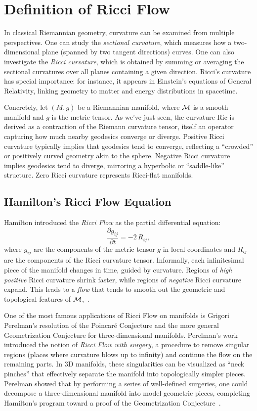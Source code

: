 \section{Definition of Ricci Flow}
In classical Riemannian geometry, curvature can be examined from multiple perspectives. One can study the \emph{sectional curvature}, which measures how a two-dimensional plane (spanned by two tangent directions) curves. One can also investigate the \emph{Ricci curvature}, which is obtained by summing or averaging the sectional curvatures over all planes containing a given direction. Ricci's curvature has special importance: for instance, it appears in Einstein's equations of General Relativity, linking geometry to matter and energy distributions in spacetime. 

Concretely, let $(M,g)$ be a Riemannian manifold, where $\mathcal{M}$ is a smooth manifold and $g$ is the metric tensor. As we've just seen, the curvature $\mathrm{Ric}$ is derived as a contraction of the Riemann curvature tensor, itself an operator capturing how much nearby geodesics converge or diverge. Positive Ricci curvature typically implies that geodesics tend to converge, reflecting a ``crowded'' or positively curved geometry akin to the sphere. Negative Ricci curvature implies geodesics tend to diverge, mirroring a hyperbolic or “saddle-like” structure. Zero Ricci curvature represents Ricci-flat manifolds.

\subsection{Hamilton's Ricci Flow Equation}
Hamilton introduced the \emph{Ricci Flow} as the partial differential equation:
\begin{equation}
\frac{\partial g_{ij}}{\partial t} = -2 \, R_{ij},
\end{equation}
where $g_{ij}$ are the components of the metric tensor $g$ in local coordinates and $R_{ij}$ are the components of the Ricci curvature tensor. Informally, each infinitesimal piece of the manifold changes in time, guided by curvature. Regions of \emph{high positive} Ricci curvature shrink faster, while regions of \emph{negative} Ricci curvature expand. This leads to a \emph{flow} that tends to smooth out the geometric and topological features of $\mathcal{M}$,~\cite{theRicciFlowAnIntroduction}.

One of the most famous applications of Ricci Flow on manifolds is Grigori Perelman's resolution of the Poincar\'{e} Conjecture and the more general Geometrization Conjecture for three-dimensional manifolds. Perelman's work introduced the notion of \emph{Ricci Flow with surgery}, a procedure to remove singular regions (places where curvature blows up to infinity) and continue the flow on the remaining parts. In 3D manifolds, these singularities can be visualized as ``neck pinches'' that effectively separate the manifold into topologically simpler pieces. Perelman showed that by performing a series of well-defined surgeries, one could decompose a three-dimensional manifold into model geometric pieces, completing Hamilton's program toward a proof of the Geometrization Conjecture~\cite{Perelman}.

